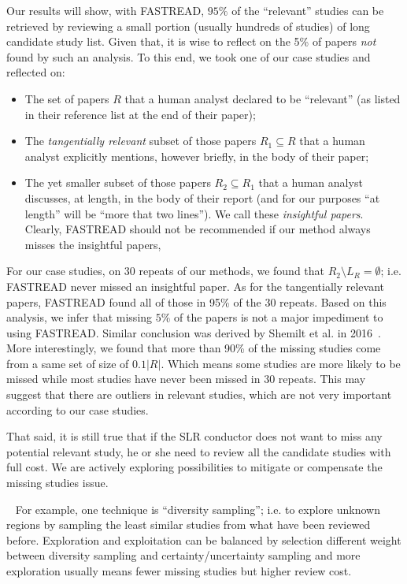 \documentclass{svjour3}
\theoremstyle{break}
\newcommand{\respto}[1]{
\fcolorbox{black}{black!15}{
\label{response:#1}
\bf
  \scriptsize R-{#1}}~
}
\begin{document}
Our results will show, with FASTREAD, $95\%$ of the ``relevant'' studies can be retrieved by reviewing a small portion (usually hundreds of studies) of long candidate study list. Given that, it is wise to reflect
on the 5\% of papers {\em not} found by such an analysis. To this end, we took one of our case studies and reflected on:
\begin{itemize}
\item The set of papers $R$ that a human analyst declared to be ``relevant'' (as listed in their reference list at the end of their paper);
\item The {\em tangentially relevant} subset of those  papers $R_1 \subseteq R$ that a human analyst explicitly mentions, however briefly, in the body of their paper;
\item The yet smaller subset of those papers $R_2 \subseteq R_1$  that a human analyst discusses, at length, in the body of their report (and for
our purposes ``at length'' will be ``more that two lines''). We call these {\em insightful papers}. Clearly, FASTREAD should not be recommended if our method always misses the insightful papers, 
\end{itemize}
For our case studies, on 30 repeats of our methods, we found that $R_2\setminus L_R=\emptyset$; i.e. FASTREAD never missed an insightful paper. As for the tangentially
relevant papers, FASTREAD found all of those in 95\% of the 30 repeats. 
Based on this analysis, we infer that missing  $5\%$ of the papers is not a major impediment to using FASTREAD. Similar conclusion was derived by Shemilt et al. in 2016~\cite{shemilt2016use}. \respto{1c}More interestingly, we found that more than 90\% of the missing studies come from a same set of size of $0.1|R|$. Which means some studies are more likely to be missed while most studies have never been missed in 30 repeats. This may suggest that there are outliers in relevant studies, which are not very important according to our case studies.

That said, it is still true that if the SLR conductor does not want to miss any potential relevant study, he or she need to review all the candidate studies with full cost. We are actively exploring possibilities to mitigate or compensate the missing studies issue. 
\respto{1d}For example, one technique is ``diversity sampling''; i.e. to explore unknown regions by sampling the least similar studies from what have been reviewed before. Exploration and exploitation can be balanced by selection different weight between diversity sampling and certainty/uncertainty sampling and more exploration usually means fewer missing studies but higher review cost.
\end{document}
